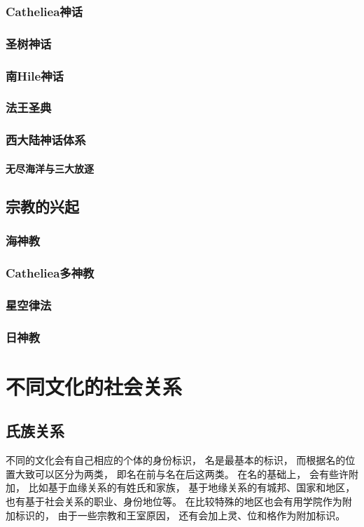 \documentclass[UTF8,12pt,draft]{ctexbook}
\begin{document}
            \subsection{Catheliea神话}
            \subsection{圣树神话}
            \subsection{南Hile神话}
            \subsection{法王圣典}
            \subsection{西大陆神话体系}
                \subsubsection{无尽海洋与三大放逐}
        \section{宗教的兴起}
            \subsection{海神教}
            \subsection{Catheliea多神教}
            \subsection{星空律法}
            \subsection{日神教}
    \chapter{不同文化的社会关系}
        \section{氏族关系}
            不同的文化会有自己相应的个体的身份标识，
            名是最基本的标识，
            而根据名的位置大致可以区分为两类，
            即名在前与名在后这两类。
            在名的基础上，
            会有些许附加，
            比如基于血缘关系的有姓氏和家族，
            基于地缘关系的有城邦、国家和地区，
            也有基于社会关系的职业、身份地位等。
            在比较特殊的地区也会有用学院作为附加标识的，
            由于一些宗教和王室原因，
            还有会加上灵、位和格作为附加标识。
\end{document}

